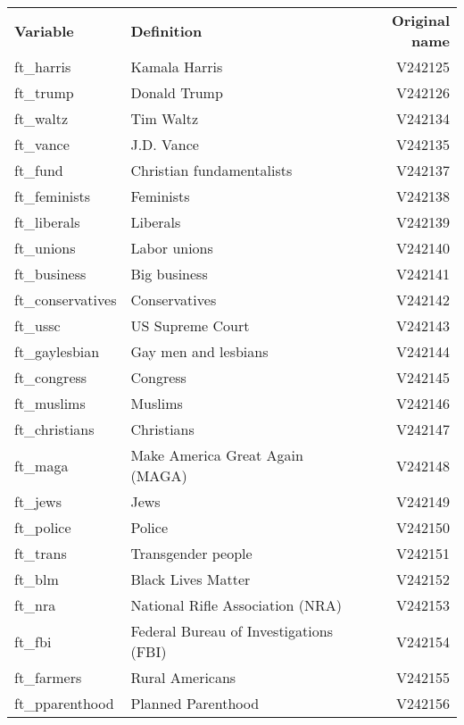 \documentclass[12pt]{article}
\begin{document}
\begin{tabular}{ l l r }
\textbf{Variable} & \textbf{Definition} & \textbf{Original name}\\
ft\_harris & Kamala Harris & V242125\\
ft\_trump & Donald Trump & V242126\\
ft\_waltz & Tim Waltz & V242134 \\
ft\_vance & J.D. Vance & V242135\\
ft\_fund & Christian fundamentalists & V242137 \\
ft\_feminists & Feminists & V242138 \\
ft\_liberals & Liberals & V242139 \\
ft\_unions & Labor unions & V242140 \\
ft\_business & Big business & V242141 \\
ft\_conservatives & Conservatives & V242142 \\
ft\_ussc & US Supreme Court & V242143 \\
ft\_gaylesbian & Gay men and lesbians & V242144 \\
ft\_congress & Congress & V242145 \\
ft\_muslims & Muslims & V242146 \\
ft\_christians & Christians & V242147 \\
ft\_maga & Make America Great Again (MAGA) & V242148 \\
ft\_jews & Jews & V242149 \\
ft\_police &  Police & V242150 \\
ft\_trans & Transgender people & V242151 \\
ft\_blm &  Black Lives Matter & V242152 \\
ft\_nra & National Rifle Association (NRA) & V242153 \\
ft\_fbi & Federal Bureau of Investigations (FBI) & V242154 \\
ft\_farmers & Rural Americans & V242155 \\
ft\_pparenthood & Planned Parenthood & V242156 \\
\end{tabular}
 
\end{document}

